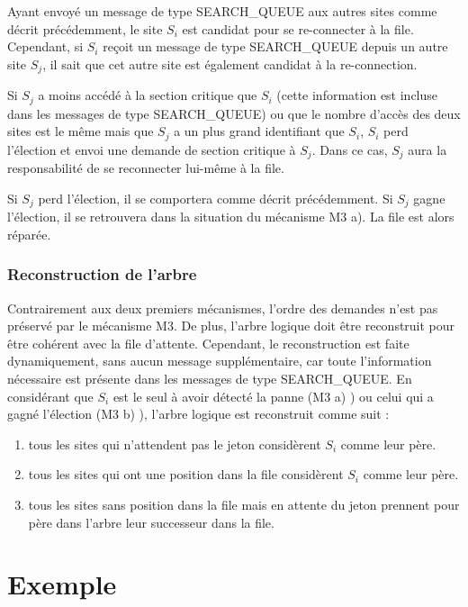 Ayant envoyé un message de type SEARCH\_QUEUE aux autres sites comme décrit précédemment, le site $S_i$ est candidat pour se re-connecter à la file. Cependant, si $S_i$ reçoit un message de type SEARCH\_QUEUE depuis un autre site $S_j$, il sait que cet autre site est également candidat à la re-connection. 

Si $S_j$ a moins accédé à la section critique que $S_i$ (cette information est incluse dans les messages de type SEARCH\_QUEUE) ou que le nombre d'accès des deux sites est le même mais que $S_j$ a un plus grand identifiant que $S_i$, $S_i$ perd l'élection et envoi une demande de section critique à $S_j$. Dans ce cas, $S_j$ aura la responsabilité de se reconnecter lui-même à la file.

Si $S_j$ perd l'élection, il se comportera comme décrit précédemment. Si $S_j$ gagne l'élection, il se retrouvera dans la situation du mécanisme M3 a). La file est alors réparée.


\subsubsection{Reconstruction de l'arbre\label{tree_rebuild}}
Contrairement aux deux premiers mécanismes, l'ordre des demandes n'est pas préservé par le mécanisme M3. De plus, l'arbre logique doit être reconstruit pour être cohérent avec la file d'attente. Cependant, le reconstruction est faite dynamiquement, sans aucun message supplémentaire, car toute l'information nécessaire est présente dans les messages de type SEARCH\_QUEUE. En considérant que $S_i$ est le seul à avoir détecté la panne (M3 a) ) ou celui qui a gagné l'élection (M3 b) ), l'arbre logique est reconstruit comme suit :
\begin{enumerate}
\item tous les sites qui n'attendent pas le jeton considèrent $S_i$ comme leur père.
\item tous les sites qui ont une position dans la file considèrent $S_i$ comme leur père.
\item tous les sites sans position dans la file mais en attente du jeton prennent pour père dans l'arbre leur successeur dans la file.
\end{enumerate}



\section{Exemple}


